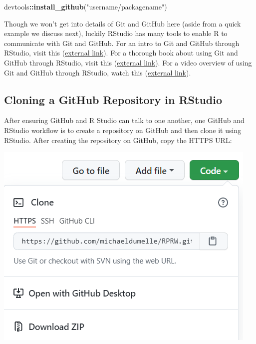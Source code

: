 \documentclass[
]{book}
\newenvironment{Shaded}{\begin{snugshade}}{\end{snugshade}}
\newcommand{\KeywordTok}[1]{\textcolor[rgb]{0.13,0.29,0.53}{\textbf{#1}}}
\newcommand{\NormalTok}[1]{#1}
\newcommand{\OperatorTok}[1]{\textcolor[rgb]{0.81,0.36,0.00}{\textbf{#1}}}
\newcommand{\StringTok}[1]{\textcolor[rgb]{0.31,0.60,0.02}{#1}}
\begin{document}
\begin{Shaded}
\begin{Highlighting}[]
\NormalTok{devtools}\OperatorTok{::}\KeywordTok{install_github}\NormalTok{(}\StringTok{"username/packagename"}\NormalTok{)}
\end{Highlighting}
\end{Shaded}

Though we won't get into details of Git and GitHub here (aside from a quick example we discuss next), luckily RStudio has many tools to enable R to communicate with Git and GitHub. For an intro to Git and GitHub through RStudio, visit this (\href{https://r-pkgs.org/git.html}{external link}). For a thorough book about using Git and GitHub through RStudio, visit this (\href{https://happygitwithr.com/}{external link}). For a video overview of using Git and GitHub through RStudio, watch this (\href{https://www.rstudio.com/resources/rstudioconf-2017/happy-git-and-gihub-for-the-user-tutorial/}{external link}).

\hypertarget{cloning-a-github-repository-in-rstudio}{%
\subsection{Cloning a GitHub Repository in RStudio}\label{cloning-a-github-repository-in-rstudio}}

After ensuring GitHub and R Studio can talk to one another, one GitHub and RStudio workflow is to create a repository on GitHub and then clone it using RStudio. After creating the repository on GitHub, copy the HTTPS URL:

\includegraphics[width=1\linewidth]{images/newrpack_github1}
\end{document}
